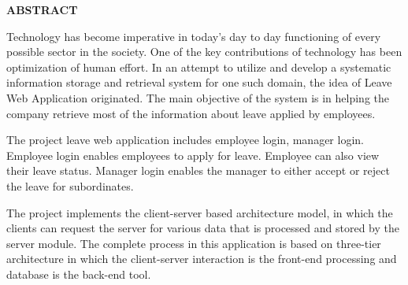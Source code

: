 \pagestyle{empty}
\begin{center}
\textup{\Large{\textbf{ABSTRACT}}}
\end{center}

\justify
\indent
Technology has become imperative in today’s day to day functioning of every possible sector in the society. One of the key contributions of technology has been optimization of human effort. In an attempt to utilize and develop a systematic information storage and retrieval system for one such domain, the idea of Leave Web Application originated. The main objective of the system is in helping the company retrieve most of the
information about leave applied by employees.

\medskip

The project leave web application includes employee login, manager login. Employee login enables employees to apply for leave. Employee can also view their leave status. Manager login enables the manager to either accept or reject the leave for subordinates. 

\medskip

The project implements the client-server based architecture model, in which the clients can request the server for various data that is processed and stored by the server module. The complete process in this application is based on three-tier architecture in which the client-server interaction is the front-end processing and database is the back-end tool.

\pagebreak
